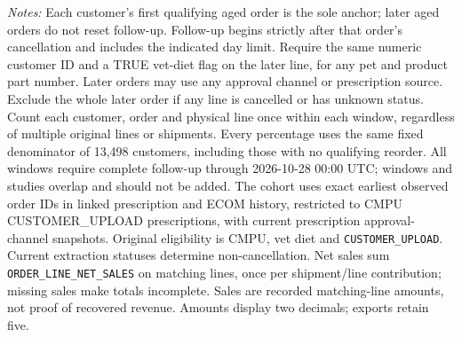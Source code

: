 \begin{table}[!htbp]
\begin{minipage}{\linewidth}
\footnotesize
\textit{Notes:} Each customer's first qualifying aged order is the sole anchor;
later aged orders do not reset follow-up. Follow-up begins strictly after that
order's cancellation and includes the indicated day limit. Require the same numeric customer ID and a TRUE vet-diet flag on the later line, for any pet and product part number. Later orders may use any approval channel or prescription
source. Exclude the whole later order if any line is cancelled or has unknown
status. Count each customer, order and physical line once within each window,
regardless of multiple original lines or shipments. Every percentage uses the
same fixed denominator of 13,498 customers, including those with no
qualifying reorder. All windows require complete follow-up through
2026-10-28 00:00 UTC; windows and studies overlap and should not be added.
The cohort uses exact earliest observed order IDs in linked prescription and
ECOM history, restricted to CMPU CUSTOMER\_UPLOAD prescriptions, with current
prescription approval-channel snapshots. Original eligibility is CMPU,
vet diet and \texttt{CUSTOMER\_UPLOAD}. Current extraction statuses determine
non-cancellation. Net sales sum \texttt{ORDER\_LINE\_NET\_SALES} on matching
lines, once per shipment/line contribution; missing sales make totals incomplete.
Sales are recorded matching-line amounts, not proof of recovered revenue.
Amounts display two decimals; exports retain five.
\end{minipage}
\end{table}
